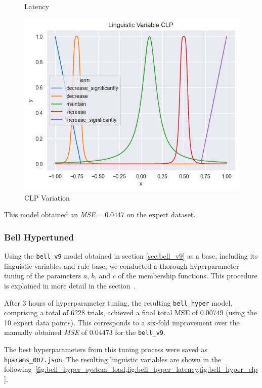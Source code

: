 \documentclass[titlepage]{article}
\begin{document}
\begin{figure}[H]
\begin{minipage}{0.32\textwidth}
        \caption{Latency}
        \label{fig:bellv9_latency}
    \end{minipage}
    \hfill
    \begin{minipage}{0.32\textwidth}
        \centering
        \includegraphics[width=\textwidth]{../images/bell_v9/CLP}
        \caption{CLP Variation}
        \label{fig:bellv9_clp}
    \end{minipage}
\end{figure}

This model obtained an \emph{MSE}$=0.0447$ on the expert dataset.

\subsubsection{Bell Hypertuned}
Using the \texttt{bell\_v9} model obtained in section \cref{sec:bell_v9} as a base, including its linguistic variables and rule base, we conducted a thorough hyperparameter tuning of the parameters $a$, $b$, and $c$ of the membership functions.
This procedure is explained in more detail in the section~.

After 3 hours of hyperparameter tuning, the resulting \texttt{bell\_hyper} model, comprising a total of 6228 trials, achieved a final total MSE of $0.00749$ (using the 10 expert data points).  
This corresponds to a six-fold improvement over the manually obtained \emph{MSE} of $0.04473$ for the \texttt{bell\_v9}.

The best hyperparameters from this tuning process were saved as \texttt{hparams\_007.json}.
The resulting linguistic variables are shown in the following~\cref{fig:bell_hyper_system_load,fig:bell_hyper_latency,fig:bell_hyper_clp}.
\end{document}
